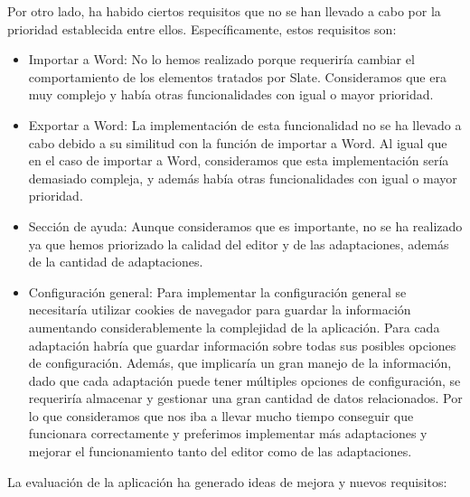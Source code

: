 Por otro lado, ha habido ciertos requisitos que no se han llevado a cabo por la prioridad establecida entre ellos. Específicamente, estos requisitos son:
\begin{itemize}
    \item Importar a Word: No lo hemos realizado porque requeriría cambiar el comportamiento de los elementos tratados por Slate. Consideramos que era muy complejo y había otras funcionalidades con igual o mayor prioridad.
    \item Exportar a Word: La implementación de esta funcionalidad no se ha llevado a cabo debido a su similitud con la función de importar a Word. Al igual que en el caso de importar a Word, consideramos que esta implementación sería demasiado compleja, y además había otras funcionalidades con igual o mayor prioridad.
    \item Sección de ayuda: Aunque consideramos que es importante, no se ha realizado ya que hemos priorizado la calidad del editor y de las adaptaciones, además de la cantidad de adaptaciones.
    \item Configuración general: Para implementar la configuración general se necesitaría utilizar cookies de navegador para guardar la información aumentando considerablemente la complejidad de la aplicación. Para cada adaptación habría que guardar información sobre todas sus posibles opciones de configuración. Además, que implicaría un gran manejo de la información, dado que cada adaptación puede tener múltiples opciones de configuración, se requeriría almacenar y gestionar una gran cantidad de datos relacionados. Por lo que consideramos que nos iba a llevar mucho tiempo conseguir que funcionara correctamente y preferimos implementar más adaptaciones y mejorar el funcionamiento tanto del editor como de las adaptaciones.
\end{itemize}

La evaluación de la aplicación ha generado ideas de mejora y nuevos requisitos:

